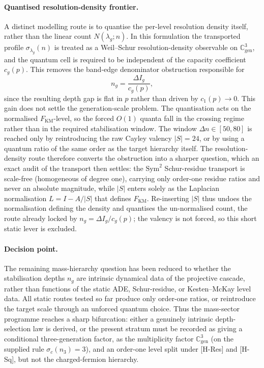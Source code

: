 \documentclass[11pt]{article}
\theoremstyle{definition}
\theoremstyle{remark}
\newcommand{\Cgen}{\mathbb{C}^{3}_{\mathrm{gen}}}
\begin{document}
    \paragraph{Quantised resolution-density frontier.}
      A distinct modelling route is to quantise the per-level resolution density itself, rather than the
      linear count \(N(\lambda_g;n)\).
      In this formulation the transported profile \(\sigma_{\lambda_g}(n)\) is treated as a Weil--Schur
      resolution-density observable on \(\Cgen\), and the quantum cell is required to be independent of the
      capacity coefficient \(c_g(p)\).
      This removes the band-edge denominator obstruction responsible for
      \[
        n_g=\frac{\Delta I_g}{c_g(p)} ,
      \]
      since the resulting depth gap is flat in \(p\) rather than driven by \(c_1(p)\to 0\).
      This gain does not settle the generation-scale problem.
      The quantisation acts on the normalised \(F_{\mathrm{KM}}\)-level, so the forced \(O(1)\) quanta fall in
      the crossing regime rather than in the required stabilisation window.
      The window \(\Delta n\in[50,80]\) is reached only by reintroducing the raw Cayley valency \(|S|=24\), or
      by using a quantum ratio of the same order as the target hierarchy itself.
      The resolution-density route therefore converts the obstruction into a sharper question, which
      an exact audit of the transport then settles:
      the \(\mathrm{Sym}^2\) Schur-residue transport is scale-free (homogeneous of degree one), carrying only
      order-one residue ratios and never an absolute magnitude, while \(|S|\) enters solely as the Laplacian
      normalisation \(L=I-A/|S|\) that defines \(F_{\mathrm{KM}}\).
      Re-inserting \(|S|\) thus undoes the normalisation defining the density and quantises the un-normalised
      count, the route already locked by \(n_g=\Delta I_g/c_g(p)\); the valency is not forced, so this short
      static lever is excluded.

    \paragraph{Decision point.}
      The remaining mass-hierarchy question has been reduced to whether the stabilisation depths \(n_g\) are
      intrinsic dynamical data of the projective cascade, rather than functions of the static ADE,
      Schur-residue, or Kesten--McKay level data.
      All static routes tested so far produce only order-one ratios, or reintroduce the target scale through an
      unforced quantum choice.
      Thus the mass-sector programme reaches a sharp bifurcation:
      either a genuinely intrinsic depth-selection law is derived, or the present stratum must be recorded as
      giving a conditional three-generation factor, as the multiplicity factor $\Cgen$ (on the supplied rule
      $\sigma_{c}(n_{3}) = 3$), and an order-one
      level split under [H-Res] and [H-Sq], but not the charged-fermion hierarchy.
\end{document}
